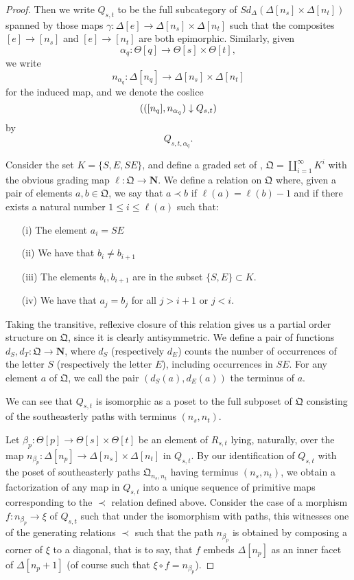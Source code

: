 \begin{proof}

Then we write \(Q_{s,t}\) to be the full subcategory of \(Sd_\Delta(\Delta[n_s]\times \Delta[n_t])\) spanned by those maps \(\gamma:\Delta[e]\to \Delta[n_s]\times \Delta[n_t]\) such that the composites \([e]\to [n_s]\) and \([e]\to [n_t]\) are both epimorphic.  Similarly, given \[\alpha_q:\Theta[q]\to \Theta[s]\times \Theta[t],\] we write \[n_{\alpha_q}:\Delta[n_q]\to \Delta[n_s]\times \Delta[n_t]\] for the induced map, and we denote the coslice \[{(([n_q],n_{\alpha_q})\downarrow Q_{s,t})}\] by \[Q_{s,t,\alpha_q}.\]  

Consider the set \(K=\{S,E,SE\}\), and define a graded set of , \(\mathfrak{Q}=\coprod_{i=1}^\infty K^i\) with the obvious grading map \(\ell:\mathfrak{Q}\to \mathbf{N}\).  We define a relation on \(\mathfrak{Q}\) where, given a pair of elements \(a,b\in \mathfrak{Q}\), we say that \(a\prec b\) if \(\ell(a)=\ell(b)-1\) and if there exists a natural number \(1\leq i \leq \ell(a)\) such that:
\begin{enumerate}
\item[(i)] The element \(a_i = SE\)
\item[(ii)] We have that \(b_i \neq b_{i+1}\)
\item[(iii)] The elements \(b_i,b_{i+1}\) are in the subset \(\{S,E\}\subset K\).
\item[(iv)] We have that \(a_j=b_j\) for all \(j > i+1\) or \(j<i\).  
\end{enumerate}
Taking the transitive, reflexive closure of this relation gives us a partial order structure on \(\mathfrak{Q}\), since it is clearly antisymmetric.
We define a pair of functions \(d_S,d_T:\mathfrak{Q}\to \mathbf{N}\), where \(d_S\) (respectively \(d_E\)) counts the number of occurrences of the letter \(S\) (respectively the letter \(E\)), including occurrences in \(SE\). For any element \(a\) of \(\mathfrak{Q}\), we call the pair \((d_S(a),d_E(a))\) the terminus of \(a\).  

We can see that \(Q_{s,t}\)  is isomorphic as a poset to the full subposet of \(\mathfrak{Q}\) consisting of the southeasterly paths with terminus \((n_s, n_t)\).  

Let \(\beta_p:\Theta[p] \to \Theta[s] \times \Theta[t]\) be an element of \(R_{s,t}\) lying, naturally, over the map \(n_{\beta_p}:\Delta[n_p]\to \Delta[n_s]\times \Delta[n_t]\) in \(Q_{s,t}\).  By our identification of \(Q_{s,t}\) with the poset of southeasterly paths \(\mathfrak{Q}_{n_s,n_t}\) having terminus \((n_s,n_t)\), we obtain a factorization of any map in \(Q_{s,t}\) into a unique sequence of primitive maps corresponding to the \(\prec\) relation defined above.  Consider the case of a morphism \(f:n_{\beta_p} \to \xi\) of \(Q_{s,t}\) such that under the isomorphism with paths, this witnesses one of the generating relations \(\prec\) such that the path \(n_{\beta_p}\) is obtained by composing a corner of \(\xi\) to a diagonal, that is to say, that \(f\) embeds \(\Delta[n_p]\) as an inner facet of \(\Delta[n_p+1]\) (of course such that \(\xi \circ f = n_{\beta_p}\)).


\end{proof}
